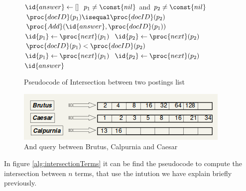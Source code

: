 \begin{figure}
    \begin{codebox}
	\li $\id{answer} \gets [] $
        \li \While $p_1 \neq \const{nil}$ and $p_2 \neq \const{nil}$ 
            \Do
        \li     \If $\proc{docID}(p_1) \isequal \proc{docID}(p_2)$
        \li         \Then $\proc{Add}(\id{answer}, \proc{docID}(p_1))$
        \li               $\id{p_1} \gets \proc{next}(p_1)$
        \li               $\id{p_2} \gets \proc{next}(p_2)$
        \li     \ElseIf $\proc{docID}(p_1) < \proc{docID}(p_2)$
        \li         \Then $\id{p_1} \gets \proc{next}(p_1)$
        \li     \Else $\id{p_2} \gets \proc{next}(p_2)$
            \End
        \li \Return $\id{answer}$
    \end{codebox}
    \caption{Pseudocode of Intersection between two postings list}
    \label{alg:intersection}
\end{figure}
\begin{figure}
    \includegraphics[width=\textwidth]{Images/andQuery}
    \caption{And query between Brutus, Calpurnia and Caesar}
    \label{img:andQuery}
\end{figure}
In figure \ref{alg:intersectionTerms} it can be find the pseudocode to compute the intersection between 
$n$ terms, that use the intution we have explain briefly previously.

